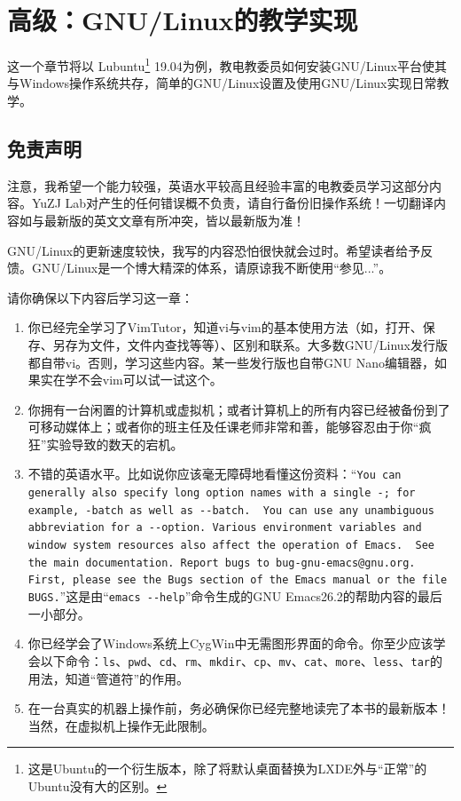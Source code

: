 \chapter{高级：GNU/Linux的教学实现}
这一个章节将以 Lubuntu\footnote{这是Ubuntu的一个衍生版本，除了将默认桌面替换为LXDE外与“正常”的Ubuntu没有大的区别。} 19.04为例，教电教委员如何安装GNU/Linux平台使其与Windows操作系统共存，简单的GNU/Linux设置及使用GNU/Linux实现日常教学。\par
\section{免责声明}
{\color{red} 注意，我希望一个能力较强，英语水平较高且经验丰富的电教委员学习这部分内容。YuZJ Lab对产生的任何错误概不负责，请自行备份旧操作系统！一切翻译内容如与最新版的英文文章有所冲突，皆以最新版为准！}\par
GNU/Linux的更新速度较快，我写的内容恐怕很快就会过时。希望读者给予反馈。GNU/Linux是一个博大精深的体系，请原谅我不断使用“参见...”。\par
请你确保以下内容后学习这一章：
\begin{enumerate}
	\item 你已经完全学习了VimTutor，知道vi与vim的基本使用方法（如，打开、保存、另存为文件，文件内查找等等）、区别和联系。大多数GNU/Linux发行版都自带vi。否则，学习这些内容。某一些发行版也自带GNU Nano编辑器，如果实在学不会vim可以试一试这个。
	\item 你拥有一台闲置的计算机或虚拟机；或者计算机上的所有内容已经被备份到了可移动媒体上；或者你的班主任及任课老师非常和善，能够容忍由于你“疯狂”实验导致的数天的宕机。
	\item 不错的英语水平。比如说你应该毫无障碍地看懂这份资料：“\verb|You can generally also specify long option names with a single -; for example, -batch as well as --batch.  You can use any unambiguous abbreviation for a --option. Various environment variables and window system resources also affect the operation of Emacs.  See the main documentation. Report bugs to bug-gnu-emacs@gnu.org.  First, please see the Bugs section of the Emacs manual or the file BUGS.|”这是由“\verb|emacs --help|”命令生成的GNU Emacs26.2的帮助内容的最后一小部分。
	\item 你已经学会了Windows系统上CygWin中无需图形界面的命令。你至少应该学会以下命令：\verb|ls|、\verb|pwd|、\verb|cd|、\verb|rm|、\verb|mkdir|、\verb|cp|、\verb|mv|、\verb|cat|、\verb|more|、\verb|less|、\verb|tar|的用法，知道“管道符”的作用。
	\item 在一台真实的机器上操作前，务必确保你已经完整地读完了本书的最新版本！当然，在虚拟机上操作无此限制。
\end{enumerate}
